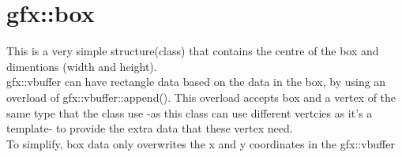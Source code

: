 \section{gfx::box}
This is a very simple structure(class) that contains the centre of the box and dimentions (width and height).\\
gfx::vbuffer can have rectangle data based on the data in the box, by using an overload of
gfx::vbuffer::append(). This overload accepts box and a vertex of the same type that the class use -as this class can use different vertcies as it's a template- to provide the extra data that these vertex need. \\
To simplify, box data only overwrites the x and y coordinates in the gfx::vbuffer
